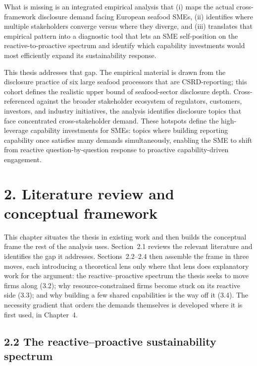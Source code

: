\documentclass[
]{article}
\begin{document}
What is missing is an integrated empirical analysis that (i) maps the
actual cross-framework disclosure demand facing European seafood SMEs,
(ii) identifies where multiple stakeholders converge versus where they
diverge, and (iii) translates that empirical pattern into a diagnostic
tool that lets an SME self-position on the reactive-to-proactive
spectrum and identify which capability investments would most
efficiently expand its sustainability response.

This thesis addresses that gap. The empirical material is drawn from the
disclosure practice of six large seafood processors that are
CSRD-reporting; this cohort defines the realistic upper bound of
seafood-sector disclosure depth. Cross-referenced against the broader
stakeholder ecosystem of regulators, customers, investors, and industry
initiatives, the analysis identifies disclosure topics that face
concentrated cross-stakeholder demand. These hotspots define the
high-leverage capability investments for SMEs: topics where building
reporting capability once satisfies many demands simultaneously,
enabling the SME to shift from reactive question-by-question response to
proactive capability-driven engagement.
\fi %



\section{2. Literature review and conceptual framework}\label{conceptual-framework}

This chapter situates the thesis in existing work and then builds the conceptual
frame the rest of the analysis uses. Section~2.1 reviews the relevant literature
and identifies the gap it addresses. Sections~2.2--2.4 then assemble the frame in
three moves, each introducing a theoretical lens only where that lens does
explanatory work for the argument: the reactive--proactive spectrum the thesis
seeks to move firms along (3.2); why resource-constrained firms become stuck on its
reactive side (3.3); and why building a few shared capabilities is the way off it
(3.4). The necessity gradient that orders the demands themselves is developed
where it is first used, in Chapter~4.



\subsection{2.2 The reactive--proactive sustainability
spectrum}\label{the-reactive-proactive-sustainability-spectrum}
\end{document}
